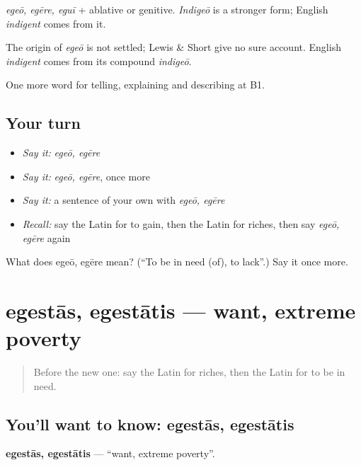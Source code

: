 \emph{egeō, egēre, eguī} + ablative or genitive. \emph{Indigeō} is a stronger form; English \emph{indigent} comes from it.

\begin{cousinweb}
The origin of \emph{egeō} is not settled; Lewis \& Short give no sure account. English \emph{indigent} comes from its compound \emph{indigeō}.
\end{cousinweb}

\begin{grammarlens}[title={What you've built}]
One more word for telling, explaining and describing at B1.
\end{grammarlens}

\subsection*{Your turn}
\begin{itemize}
\raggedright
  \item \emph{Say it:} \emph{egeō, egēre}
  \item \emph{Say it:} \emph{egeō, egēre}, once more
  \item \emph{Say it:} a sentence of your own with \emph{egeō, egēre}
  \item \emph{Recall:} say the Latin for to gain, then the Latin for riches, then say \emph{egeō, egēre} again
\end{itemize}

\begin{tcolorbox}[breakable,colback=teal!4,colframe=teal!35!black,title={Before you move on}]
What does egeō, egēre mean? (\textquotedblleft{}To be in need (of), to lack\textquotedblright{}.) Say it once more.
\end{tcolorbox}
\section[egestās, egestātis]{egestās, egestātis — want, extreme poverty}

\label{lesson:LA-C422-egestas}



\begin{quote}
Before the new one: say the Latin for riches, then the Latin for to be in need.
\end{quote}

\subsection*{You'll want to know: egestās, egestātis}
\textbf{egestās, egestātis} — \textquotedblleft{}want, extreme poverty\textquotedblright{}.

